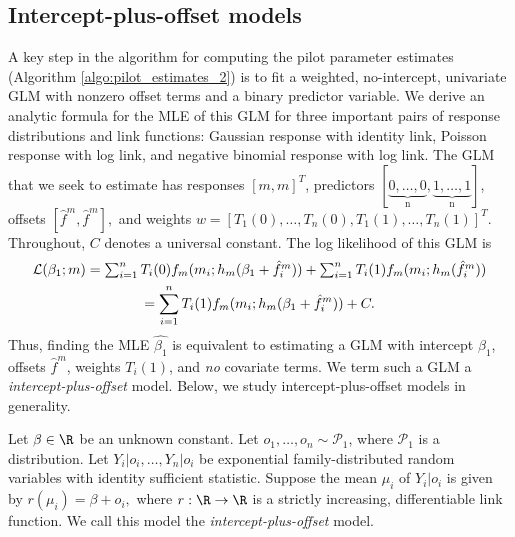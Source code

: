 \documentclass[11pt]{article}
\begin{document}
\begin{appendices}
\begin{refsection}
\subsection*{Intercept-plus-offset models}

A key step in the algorithm for computing the pilot parameter estimates (Algorithm \ref{algo:pilot_estimates_2}) is to fit a weighted, no-intercept, univariate GLM with nonzero offset terms and a binary predictor variable. We derive an analytic formula for the MLE of this GLM for three important pairs of response distributions and link functions: Gaussian response with identity link, Poisson response with log link, and negative binomial response with log link. The GLM that we seek to estimate has responses $[m,m]^T$, predictors $[\underbrace{0, \dots, 0}_\textrm{n}, \underbrace{1, \dots, 1}_\textrm{n}]$, offsets $[\hat{f}^m, \hat{f}^m],$ and weights $w = [T_1(0), \dots, T_n(0), T_1(1), \dots, T_n(1)]^T.$ Throughout, $C$ denotes a universal constant. The log likelihood of this GLM is
\begin{multline}\label{stat_acc_1}
$$\mathcal{L}(\beta_1; m) = \sum_{i=1}^n T_i(0) f_m(m_i; h_m(\beta_1 + \hat{f}^m_i )) + \sum_{i=1}^n T_i(1) f_m(m_i; h_m(\hat{f}^m_i)) \\ = \sum_{i=1}^n T_i(1) f_m(m_i; h_m(\beta_1 + \hat{f}^m_i )) + C.$$
\end{multline}
Thus, finding the MLE $\hat{\beta_1}$ is equivalent to estimating a GLM with intercept $\beta_1$, offsets $\hat{f}^m$, weights $T_i(1)$, and \textit{no} covariate terms. We term such a GLM a \textit{intercept-plus-offset} model. Below, we study intercept-plus-offset models in generality.

Let $\beta \in \R$ be an unknown constant. Let $o_1, \dots, o_n \sim \mathcal{P}_1$, where $\mathcal{P}_1$ is a distribution. Let $Y_i|o_i, \dots, Y_n|o_i$ be exponential family-distributed random variables with identity sufficient statistic. Suppose the mean $\mu_i$ of $Y_i|o_i$ is given by $r(\mu_i) = \beta + o_i,$ where $r: \R \to \R$ is a strictly increasing, differentiable link function. We call this model the \textit{intercept-plus-offset} model.


\end{refsection}
\end{appendices}
\end{document}
